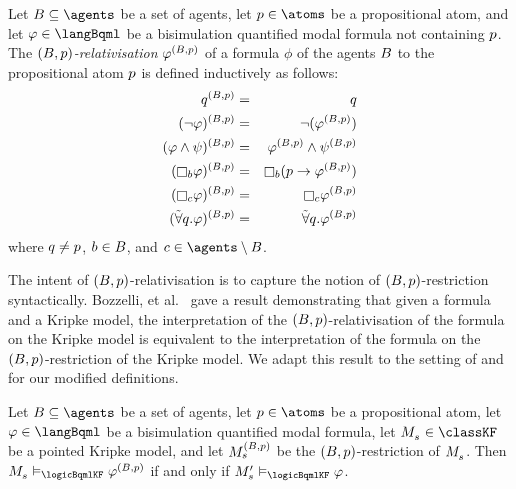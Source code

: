 \begin{definition}[Relativisation]
Let $\agentsB \subseteq \agents$ be a set of agents, let $\atomP \in \atoms$ be a propositional atom, and let $\phi \in \langBqml$ be a bisimulation quantified modal formula not containing $p$.
The {\em $(B, p)$-relativisation} $\varphi^{(B, p)}$ of a formula $\phi$ of the agents $B$ to the propositional atom $p$ is defined inductively as follows:
\begin{eqnarray*}
    \atomQ^{(\agentsB, \atomP)} &=& \atomQ\\
    (\lnot \phi)^{(\agentsB, \atomP)} &=& \lnot (\phi^{(\agentsB, \atomP)})\\
    (\phi \land \psi)^{(\agentsB, \atomP)} &=& \phi^{(\agentsB, \atomP)} \land \psi^{(\agentsB, \atomP)}\\
    (\necessaryB \phi)^{(\agentsB, \atomP)} &=& \necessaryB (\atomP \implies \phi^{(\agentsB, \atomP)})\\
    (\necessaryC \phi)^{(\agentsB, \atomP)} &=& \necessaryC \phi^{(\agentsB, \atomP)}\\
    (\allbisimsQ \phi)^{(\agentsB, \atomP)} &=& \allbisimsQ \phi^{(\agentsB, \atomP)}\\
\end{eqnarray*}
where $q \neq p$, $b \in B$, and $\agentC \in \agents \setminus \agentsB$.
\end{definition}

The intent of $(B, p)$-relativisation is to capture the notion of $(B, p)$-restriction syntactically.
Bozzelli, et al.~\cite{bozzelli:2014b} gave a result demonstrating that given a \langBqml{} formula and a Kripke model, the interpretation of the $(B, p)$-relativisation of the formula on the Kripke model is equivalent to the interpretation of the formula on the $(B, p)$-restriction of the Kripke model.
We adapt this result to the setting of \classKF{} and for our modified definitions.

\begin{lemma}\label{rml-k4-relativisation-restriction}
Let $\agentsB \subseteq \agents$ be a set of agents, let $\atomP \in \atoms$ be a propositional atom, let $\phi \in \langBqml$ be a bisimulation quantified modal formula, let $\kPModel{\kStateS} \in \classKF$ be a pointed Kripke model, and let $\kPModel[(\agentsB, \atomP)]{\kStateS}$ be the $(B, p)$-restriction of $\kPModel{\kStateS}$.
Then $\kPModel{\kStateS} \entails_\logicBqmlKF \phi^{(\agentsB, \atomP)}$ if and only if $\kPModelP{\kStateS} \entails_\logicBqmlKF \phi$.
\end{lemma}

